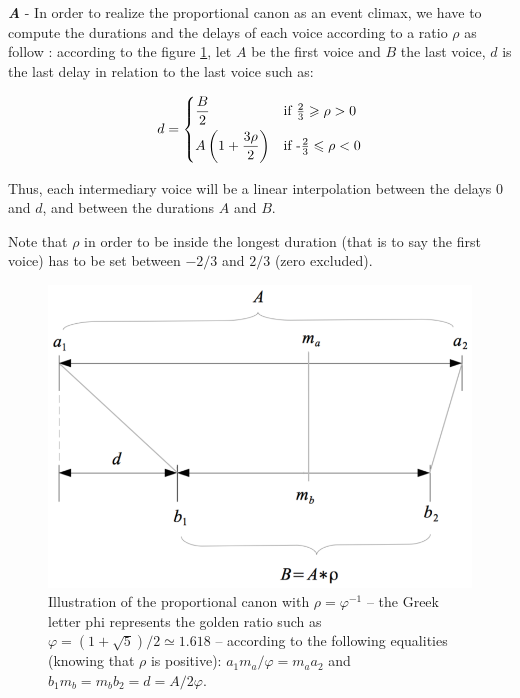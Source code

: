 \bigskip

\textbf{\textit{A}} - In order to realize the proportional canon as an event climax, we have to compute the durations and the delays of each voice according to a ratio $\rho$ as follow : according to the figure \ref{canon}, let $A$ be the first voice and $B$ the last voice, $d$ is the last delay in relation to the last voice such as:
  
\[
     d =
\begin{dcases}
	\frac{B}{2}  & \text{if } \tfrac{2}{3} \geqslant \rho > 0\\
	A \left ( 1+ \frac{3\rho}{2} \right )  & \text{if } \text{-} \tfrac{2}{3} \leqslant \rho < 0
   \end{dcases}
\]

  \noindent Thus, each intermediary voice will be a linear interpolation between the delays $0$ and $d$, and between the durations $A$ and $B$.
  
  Note that $\rho$ in order to be inside the longest duration (that is to say the first voice) has to be set between $-2/3$ and $2/3$ (zero excluded).
  
\begin{figure}[h]
\begin{center}
\includegraphics[scale=1.2]{img/3499}
\caption{Illustration of the proportional canon with $\rho = \varphi ^{-1}$ -- the Greek letter phi represents the golden ratio such as $\varphi = (1+ \sqrt 5)/2 \simeq 1.618$ -- according to the following equalities (knowing that $\rho$ is positive): $a_1m_a/ \varphi =m_aa_2$ and $ b_1m_b=m_bb_2=d=A/2 \varphi$.}
\label{canon}
\end{center}
\end{figure}
  
